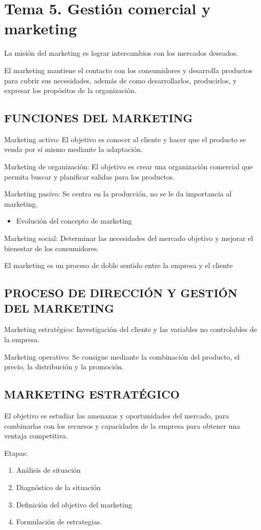 \documentclass[12pt, twoside, openright]{report} %
\begin{document}
\chapter{Tema 5. Gestión comercial y marketing}
La misión del marketing es lograr intercambios con los mercados deseados.

El marketing mantiene el contacto con los consumidores y desarrolla productos para cubrir sus
necesidades, además de como desarrollarlos, producirlos, y expresar los propósitos de la
organización.

\section{FUNCIONES DEL MARKETING}
Marketing activo: El objetivo es conocer al cliente y hacer que el producto se venda por sí mismo
mediante la adaptación.

Marketing de organización: El objetivo es crear una organización comercial que permita buscar y
planificar salidas para los productos.

Marketing pasivo: Se centra en la producción, no se le da importancia al marketing.
\begin{itemize}
	\item Evolución del concepto de marketing
\end{itemize}

Marketing social: Determinar las necesidades del mercado objetivo y mejorar el bienestar de los
consumidores.

El marketing es un proceso de doble sentido entre la empresa y el cliente

\section{PROCESO DE DIRECCIÓN Y GESTIÓN DEL MARKETING}
Marketing estratégico: Investigación del cliente y las variables no controlables de la empresa.

Marketing operativo: Se consigue mediante la combinación del producto, el precio, la distribución y
la promoción.

\section{MARKETING ESTRATÉGICO}
El objetivo es estudiar las amenazas y oportunidades del mercado, para combinarlas con los recursos
y capacidades de la empresa para obtener una ventaja competitiva.
\pagebreak

Etapas:
\begin{enumerate}
	\item Análisis de situación
	\item Diagnóstico de la situación
	\item Definición del objetivo del marketing
	\item Formulación de estrategias.
\end{enumerate}
\end{document}
